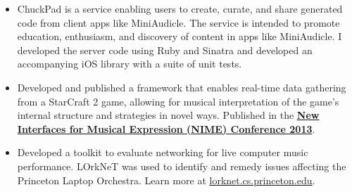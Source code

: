

\begin{cvparagraph}
 
\vspace{2.0mm}

\begin{justify}
\begin{itemize}[leftmargin=2ex, nosep]
    \renewcommand{\labelitemi}{\bullet}
\vspace{-2.0mm}
\item ChuckPad is a service enabling users to create, curate, and share generated code from client apps like MiniAudicle.
The service is intended to promote education, enthusiasm, and discovery of content in apps like MiniAudicle.
I developed the server code using Ruby and Sinatra and developed an accompanying iOS library with a suite of unit tests. 
\end{itemize}
\end{justify}


\begin{justify}
\begin{itemize}[leftmargin=2ex, nosep]
    \renewcommand{\labelitemi}{\bullet}
\vspace{-2.0mm}
\item Developed and published a framework that enables real-time data gathering from a StarCraft 2 game, allowing for musical interpretation of the game’s internal structure and strategies in novel ways.
Published in the \href{http://www.nime.org/proceedings/2013/nime2013_146.pdf}{\textbf{New Interfaces for Musical Expression (NIME) Conference 2013}}.
\end{itemize}
\end{justify}

\begin{justify}
\begin{itemize}[leftmargin=2ex, nosep]
    \renewcommand{\labelitemi}{\bullet}
\vspace{-2.0mm}
\item Developed a toolkit to evaluate networking for live computer music performance.
LOrkNeT was used to identify and remedy issues affecting the Princeton Laptop Orchestra.
Learn more at \href{lorknet.cs.princeton.edu}{\underline{lorknet.cs.princeton.edu}}.
\end{itemize}
\end{justify}


\end{cvparagraph}
